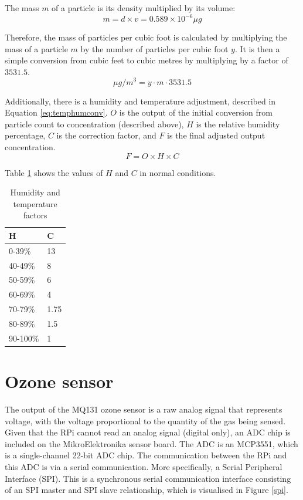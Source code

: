 \documentclass[11pt]{report}
\begin{document}
The mass $m$ of a particle is its density multiplied by its volume:
\begin{equation}
m = d \times v = 0.589 \times 10^{-6} \mu g
\end{equation}

Therefore, the mass of particles per cubic foot is calculated by multiplying the mass of a particle $m$ by the number of particles per cubic foot $y$. It is then a simple conversion from cubic feet to cubic metres by multiplying by a factor of $3531.5$.
\begin{equation}
\mu g/m^3 = y \cdot m \cdot 3531.5
\end{equation}

Additionally, there is a humidity and temperature adjustment, described in Equation \ref{eq:temphumconv}. $O$ is the output of the initial conversion from particle count to concentration (described above), $H$ is the relative humidity percentage, $C$ is the correction factor, and $F$ is the final adjusted output concentration.
\begin{equation} \label{eq:temphumconv}
F = O \times H \times C
\end{equation}

Table \ref{humtemp} shows the values of $H$ and $C$ in normal conditions.


\begin{table}[!htbp]
  \centering
  \caption{Humidity and temperature factors}
  \label{humtemp}
  \begin{tabular}{ l l }
  \toprule 
  H & C \\ \midrule
  0-39\% & 13 \\
  40-49\% & 8 \\
  50-59\% & 6 \\
  60-69\% & 4 \\
  70-79\% & 1.75 \\
  80-89\% & 1.5 \\
  90-100\% & 1 \\  \bottomrule
  \end{tabular}
\end{table}

\section{Ozone sensor} \label{mq131_calibration}

The output of the MQ131 ozone sensor is a raw analog signal that represents voltage, with the voltage proportional to the quantity of the gas being sensed. Given that the RPi cannot read an analog signal (digital only), an ADC chip is included on the MikroElektronika sensor board. The ADC is an MCP3551, which is a single-channel 22-bit ADC chip. The communication between the RPi and this ADC is via a serial communication. More specifically, a Serial Peripheral Interface (SPI). This is a synchronous serial communication interface consisting of an SPI master and SPI slave relationship, which is visualised in Figure \ref{spi}.
\end{document}

